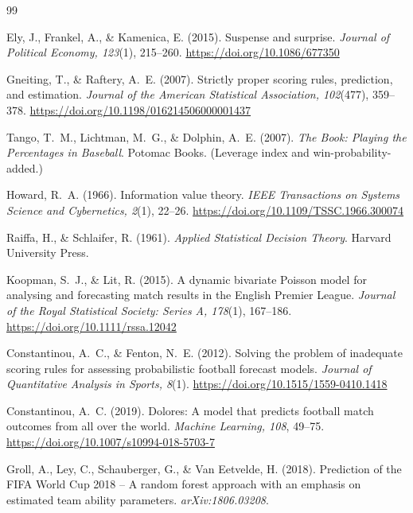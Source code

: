 \documentclass[11pt,letterpaper]{article}
\begin{document}
\begin{thebibliography}{99}

Ely, J., Frankel, A., \& Kamenica, E. (2015). Suspense and surprise. \emph{Journal of Political Economy, 123}(1), 215--260. \url{https://doi.org/10.1086/677350}

Gneiting, T., \& Raftery, A.~E. (2007). Strictly proper scoring rules, prediction, and estimation. \emph{Journal of the American Statistical Association, 102}(477), 359--378. \url{https://doi.org/10.1198/016214506000001437}

Tango, T.~M., Lichtman, M.~G., \& Dolphin, A.~E. (2007). \emph{The Book: Playing the Percentages in Baseball}. Potomac Books. (Leverage index and win-probability-added.)

Howard, R.~A. (1966). Information value theory. \emph{IEEE Transactions on Systems Science and Cybernetics, 2}(1), 22--26. \url{https://doi.org/10.1109/TSSC.1966.300074}

Raiffa, H., \& Schlaifer, R. (1961). \emph{Applied Statistical Decision Theory}. Harvard University Press.

Koopman, S.~J., \& Lit, R. (2015). A dynamic bivariate Poisson model for analysing and forecasting match results in the English Premier League. \emph{Journal of the Royal Statistical Society: Series A, 178}(1), 167--186. \url{https://doi.org/10.1111/rssa.12042}

Constantinou, A.~C., \& Fenton, N.~E. (2012). Solving the problem of inadequate scoring rules for assessing probabilistic football forecast models. \emph{Journal of Quantitative Analysis in Sports, 8}(1). \url{https://doi.org/10.1515/1559-0410.1418}

Constantinou, A.~C. (2019). Dolores: A model that predicts football match outcomes from all over the world. \emph{Machine Learning, 108}, 49--75. \url{https://doi.org/10.1007/s10994-018-5703-7}

Groll, A., Ley, C., Schauberger, G., \& Van Eetvelde, H. (2018). Prediction of the FIFA World Cup 2018 -- A random forest approach with an emphasis on estimated team ability parameters. \emph{arXiv:1806.03208}.


\end{thebibliography}
\end{document}
